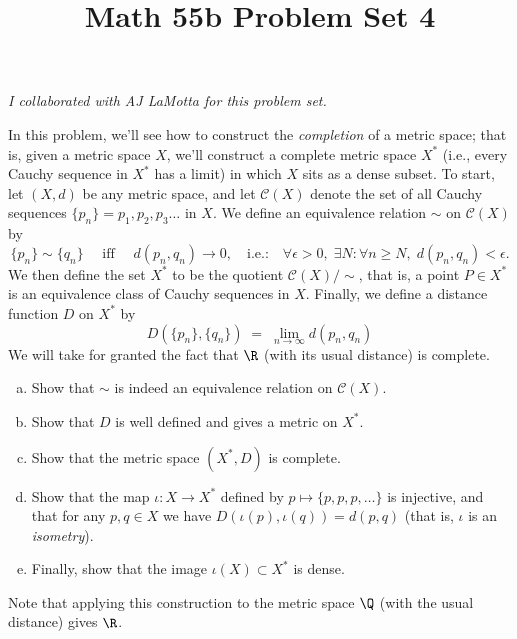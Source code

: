 \documentclass[11pt,letterpaper]{article}
\title{\textbf{Math 55b Problem Set 4}}
\begin{document}
\maketitle

\begin{center}
    \textit{I collaborated with AJ LaMotta for this problem set.}
\end{center}

\begin{problem}
    In this problem, we'll see how to construct the \emph{completion} of a metric space; that is, given a metric space $X$, we'll construct a complete metric space $X^*$ (i.e., every Cauchy sequence in $X^*$ has a limit) in which $X$ sits as a dense subset. To start, let $(X,d)$ be any metric space, and let $\mathcal{C}(X)$ denote the set of all Cauchy sequences $\{p_n\} = p_1,p_2,p_3\dots$ in $X$. We define an equivalence relation $\sim$ on $\mathcal{C}(X)$ by
    \[
        \{p_n\} \sim \{q_n\} \quad \text{ iff } \quad d(p_n,q_n)\to 0, \quad \text{i.e.:} \quad \forall \epsilon > 0, \; \exists N : \forall n \geq N, \; d(p_n, q_n) < \epsilon.
    \]
    We then define the set $X^*$ to be the quotient $\mathcal{C}(X)/\!\!\sim$, that is, a point $P\in X^*$ is an equivalence class of Cauchy sequences in $X$. Finally, we define a distance function $D$ on $X^*$ by 
    \[
        D(\{p_n\}, \{q_n\}) \; = \; \lim_{n \to \infty} d(p_n,q_n)
    \]
    We will take for granted the fact that $\R$ (with its usual distance) is complete.
    \begin{enumerate}[(a)]
        \item Show that $\sim$ is indeed an equivalence relation on $\mathcal{C}(X)$.
        \item Show that $D$ is well defined and gives a metric on $X^*$.
        \item Show that the metric space $(X^*, D)$ is complete.
        \item Show that the map $\iota : X \to X^*$ defined by $p \mapsto \{p,p,p,\dots\}$ is injective, and that for any $p, q \in X$ we have $D(\iota(p), \iota(q)) = d(p,q)$ (that is, $\iota$ is an \emph{isometry}).
        \item Finally, show that the image $\iota(X) \subset X^*$ is dense.
    \end{enumerate}

    Note that applying this construction to the metric space $\Q$ (with the usual distance) gives $\R$. 
    


\end{problem}
\end{document}
